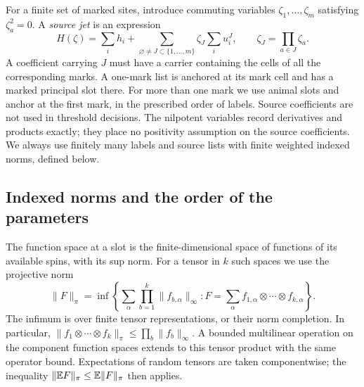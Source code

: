 For a finite set of marked sites, introduce commuting variables
$\zeta_1,\ldots,\zeta_m$ satisfying $\zeta_a^2=0$.  A \emph{source jet}
is an expression
\begin{equation}
 H(\zeta)=\sum_i h_i+
       \sum_{\varnothing\ne J\subset\{1,\ldots,m\}}
             \zeta_J\sum_i u_i^J,
 \qquad \zeta_J=\prod_{a\in J}\zeta_a.
 \label{block:jet}
\end{equation}
A coefficient carrying $J$ must have a carrier containing the cells of
all the corresponding marks.  A one-mark list is anchored at its mark
cell and has a marked principal slot there.  For more than one mark we
use animal slots and anchor at the first mark, in the prescribed order
of labels.  Source coefficients are not used in threshold decisions.
The nilpotent variables record derivatives and products exactly; they
place no positivity assumption on the source coefficients.  We always
use finitely many labels and source lists with finite weighted indexed
norms, defined below.

\subsection{Indexed norms and the order of the parameters}

The function space at a slot is the finite-dimensional space of functions
of its available spins, with its sup norm.  For a tensor in $k$ such
spaces we use the projective norm
\begin{equation}
 \|F\|_\pi=
 \inf\left\{\sum_{\alpha}\prod_{b=1}^k
            \|f_{b,\alpha}\|_\infty:
       F=\sum_{\alpha}f_{1,\alpha}\otimes\cdots\otimes f_{k,\alpha}
       \right\}.
 \label{block:projective}
\end{equation}
The infimum is over finite tensor representations, or their norm
completion.  In particular,
$\|f_1\otimes\cdots\otimes f_k\|_\pi\le\prod_b\|f_b\|_\infty$.
A bounded multilinear operation on the component function spaces extends
to this tensor product with the same operator bound.  Expectations of
random tensors are taken componentwise; the inequality
$\|\mathbb E F\|_\pi\le\mathbb E\|F\|_\pi$ then applies.

